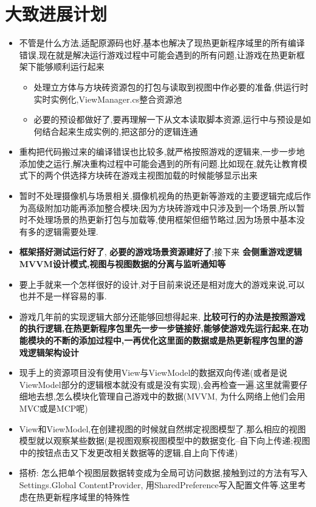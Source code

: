 \documentclass[9pt, b5paper]{article}
\begin{document}
\section{大致进展计划}
\label{sec-2}
\begin{itemize}
\item 不管是什么方法,适配原源码也好,基本也解决了现热更新程序域里的所有编译错误,现在就是解决运行游戏过程中可能会遇到的所有问题,让游戏在热更新框架下能够顺利运行起来
\begin{itemize}
\item 处理立方体与方块砖资源包的打包与读取到视图中作必要的准备,供运行时实时实例化,ViewManager.cs整合资源池
\item 必要的预设都做好了,要再理解一下从文本读取脚本资源,运行中与预设是如何结合起来生成实例的,把这部分的逻辑连通
\end{itemize}
\item 重构把代码搬过来的编译错误也比较多,就严格按照游戏的逻辑来,一步一步地添加使之运行,解决重构过程中可能会遇到的所有问题.比如现在,就先让教育模式下的两个供选择方块砖在游戏主视图加载的时候能够显示出来
\item 暂时不处理摄像机与场景相关,摄像机视角的热更新等游戏的主要逻辑完成后作为高级附加功能再添加整合模块;因为方块砖游戏中只涉及到一个场景,所以暂时不处理场景的热更新打包与加载等,使用框架但细节略过,因为场景中基本没有多的逻辑需要处理.
\item \textbf{框架搭好测试运行好了}, \textbf{必要的游戏场景资源建好了};接下来 \textbf{会侧重游戏逻辑MVVM设计模式,视图与视图数据的分离与监听通知等}
\item 要上手就来一个怎样很好的设计,对于目前来说还是相对庞大的游戏来说,可以也并不是一样容易的事.
\item 游戏几年前的实现逻辑大部分还能够回想得起来, \textbf{比较可行的办法是按照游戏的执行逻辑,在热更新程序包里先一步一步链接好,能够使游戏先运行起来,在功能模块的不断的添加过程中,一再优化这里面的数据或是热更新程序包里的游戏逻辑架构设计}
\item 现手上的资源项目没有使用View与ViewModel的数据双向传递(或者是说ViewModel部分的逻辑根本就没有或是没有实现),会再检查一遍.这里就需要仔细地去想,怎么模块化管理自己游戏中的数据(MVVM, 为什么网络上他们会用MVC或是MCP呢)
\item View和ViewModel,在创建视图的时候就自然绑定视图模型了.那么相应的视图模型就以观察某些数据(是视图观察视图模型中的数据变化--自下向上传递;视图中的按钮点击又下发更改相关数据等的逻辑,自上向下传递)
\item 搭桥: 怎么把单个视图层数据转变成为全局可访问数据,接触到过的方法有写入Settings.Global ContentProvider, 用SharedPreference写入配置文件等.这里考虑在热更新程序域里的特殊性

\end{itemize}
\end{document}
